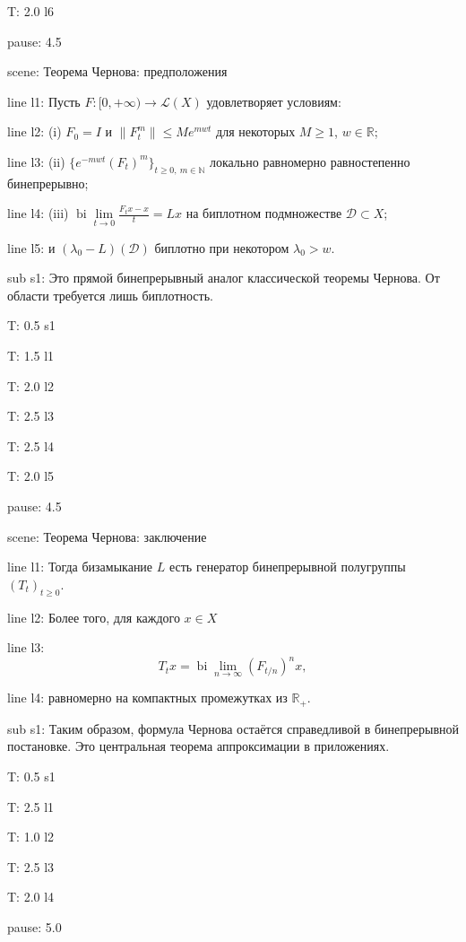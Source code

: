 \documentclass[a4paper,11pt]{article}
\newcommand{\R}{\mathbb{R}}
\newcommand{\N}{\mathbb{N}}
\begin{document}
T: 2.0 l6

pause: 4.5



scene: {Теорема Чернова: предположения}

line l1: {Пусть $F:[0,+\infty)\to\mathcal{L}(X)$ удовлетворяет условиям:}

line l2: {(i) $F_0=I$ и $\|F_t^m\|\le Me^{mwt}$ для некоторых $M\ge1$, $w\in\R$;}

line l3: {(ii) $\{e^{-mwt}(F_t)^m\}_{t\ge0,\ m\in\N}$ локально равномерно равностепенно бинепрерывно;}

line l4: {(iii) $\operatorname{bi}\lim\limits_{t\to0}\frac{F_t x-x}{t}=Lx$ на биплотном подмножестве $\mathcal{D}\subset X$;}

line l5: {и $(\lambda_0-L)(\mathcal{D})$ биплотно при некотором $\lambda_0>w$.}


sub s1: {Это прямой бинепрерывный аналог классической теоремы Чернова. От области требуется лишь биплотность.}


T: 0.5 s1

T: 1.5 l1

T: 2.0 l2

T: 2.5 l3

T: 2.5 l4

T: 2.0 l5

pause: 4.5



scene: {Теорема Чернова: заключение}

line l1: {Тогда бизамыкание $L$ есть генератор бинепрерывной полугруппы $(T_t)_{t\ge0}$.}

line l2: {Более того, для каждого $x\in X$}

line l3: {$$T_t x=\operatorname{bi}\lim\limits_{n\to\infty}(F_{t/n})^n x,$$}

line l4: {равномерно на компактных промежутках из $\R_+$.}


sub s1: {Таким образом, формула Чернова остаётся справедливой в бинепрерывной постановке. Это центральная теорема аппроксимации в приложениях.}


T: 0.5 s1

T: 2.5 l1

T: 1.0 l2

T: 2.5 l3

T: 2.0 l4

pause: 5.0


\end{document}
